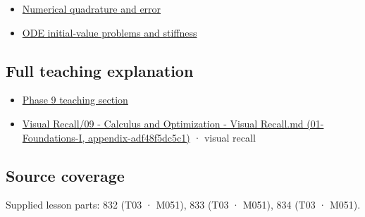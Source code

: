 \begin{itemize}
\tightlist
\item
  \hyperref[appendix-80521eae6b71]{Numerical quadrature and error}
\item
  \hyperref[appendix-e8ab9836882e]{ODE initial-value problems and stiffness}
\end{itemize}

\subsection{Full teaching explanation}\label{appendix-1a50e72435c2-full-teaching-explanation}

\begin{itemize}
\tightlist
\item
  \hyperref[02-foundations-ii-ch022-integration-and-quadrature]{Phase 9 teaching section}
\item
  \href{../01-Foundations-I/main.pdf\#nameddest=appendix-adf48f5dc5c1}{Visual Recall/09 - Calculus and Optimization - Visual Recall.md (01-Foundations-I, appendix-adf48f5dc5c1)} · visual recall
\end{itemize}

\subsection{Source coverage}\label{appendix-1a50e72435c2-source-coverage}

Supplied lesson parts: 832 (T03 · M051), 833 (T03 · M051), 834 (T03 · M051).
